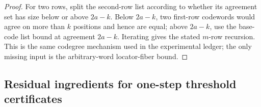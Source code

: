\documentclass[11pt]{article}
\theoremstyle{definition}
\theoremstyle{remark}
\begin{document}
\begin{proof}
For two rows, split the second-row list according to whether its agreement set
has size below or above $2a-k$.  Below $2a-k$, two first-row codewords would
agree on more than $k$ positions and hence are equal; above $2a-k$, use the
base-code list bound at agreement $2a-k$.  Iterating gives the stated $m$-row
recursion.  This is the same codegree mechanism used in the experimental ledger;
the only missing input is the arbitrary-word locator-fiber bound.
\end{proof}

\subsection{Residual ingredients for one-step threshold certificates}
\end{document}
